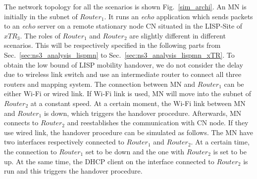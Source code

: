 
The network topology for all the scenarios is shown Fig.~\ref{sim_archi}. An MN is initially in the subnet of $Router_1$. It runs an \emph{echo} application which sends packets to an \emph{echo} server on a remote stationary node CN situated in the LISP-Site of $xTR_3$. The roles of $Router_1$ and $Router_2$ are slightly different in different scenarios. This will be respectively specified in the following parts from Sec.~\ref{sec:ns3_analysis_lispmn} to Sec.~\ref{sec:ns3_analysis_lispmn_xTR}.  
To obtain the low bound of LISP mobility handover, we do not consider the delay due to wireless link switch and use an intermediate router to connect all three routers and mapping system. The connection between MN and $Router_1$ can be either Wi-Fi or wired link. If Wi-Fi link is used, MN will move into the subnet of $Router_2$ at a constant speed. At a certain moment, the Wi-Fi link between MN and $Router_1$ is down, which triggers the handover procedure. Afterwards, MN connects to $Router_2$ and reestablishes the communication with CN node. If they use wired link, the handover procedure can be simulated as follows. The MN have two interfaces respectively connected to $Router_1$ and $Router_2$. At a certain time, the connection to $Router_1$ set to be down and the one with $Router_2$ is set to be up. At the same time, the DHCP client on the interface connected to $Router_2$ is run and this triggers the handover procedure.

